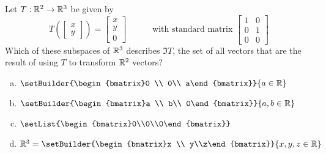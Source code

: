 \begin{activity}{5}
Let $T: \mathbb{R}^2 \rightarrow \mathbb{R}^3$ be given by
\[
  T\left(\begin{bmatrix}x \\ y \end{bmatrix} \right)
    =
  \begin{bmatrix} x \\ y \\ 0 \end{bmatrix}
    \hspace{3em}
    \text{with standard matrix }
  \begin{bmatrix} 1 & 0 \\ 0 & 1 \\ 0 & 0 \end{bmatrix}
\]
Which of these subspaces of \(\mathbb{R}^3\) describes \(\Im T\),
the set of all vectors that are the result of using \(T\) to transform
\(\mathbb{R}^2\) vectors?
\begin{multicols}{2}
\begin{enumerate}[a)]
\item \(\setBuilder{\begin{bmatrix}0 \\ 0\\ a\end{bmatrix}}{a\in\IR}\)
\item \(\setBuilder{\begin{bmatrix}a \\ b\\ 0\end{bmatrix}}{a,b\in\IR}\)
\item \(\setList{\begin{bmatrix}0\\0\\0\end{bmatrix}}\)
\item \(\IR^3=\setBuilder{\begin{bmatrix}x \\ y\\z\end{bmatrix}}{x,y,z\in\IR}\)
\end{enumerate}
\end{multicols}
\end{activity}

